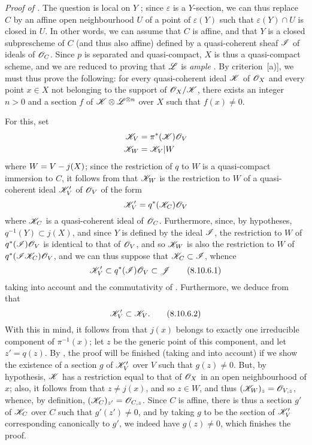 \begin{env}[8.10.6]
\label{II.8.10.6}
\emph{Proof of .}
The question is local on $Y$ ;
since $\varepsilon$ is a $Y$-section, we can thus replace $C$ by an affine open neighbourhood $U$ of a point of $\varepsilon(Y)$ such that $\varepsilon(Y)\cap U$ is closed in $U$.
In other words, we can assume that $C$ is affine, and that $Y$ is a closed subprescheme of $C$ (and thus also affine) defined by a quasi-coherent sheaf
$\mathscr{I}$ of ideals of $\mathscr{O}_C$.
Since $p$ is separated and quasi-compact, $X$ is thus a quasi-compact scheme, and we are reduced to proving that $\mathscr{L}$ is \emph{ample} .
By criterion~[a)], we must thus prove the following:
for every quasi-coherent ideal $\mathscr{K}$ of $\mathscr{O}_X$ and every point $x\in X$ not belonging to the support of $\mathscr{O}_X/\mathscr{K}$, there exists an integer $n>0$ and a section $f$ of $\mathscr{K}\otimes\mathscr{L}^{\otimes n}$ over $X$ such that $f(x)\neq0$.

For this, set
\begin{align*}
    \mathscr{K}_V &= \pi^*(\mathscr{K})\mathscr{O}_V
\\  \mathscr{K}_W &= \mathscr{K}_V|W
\end{align*}
where $W=V- j(X)$;
since the restriction of $q$ to $W$ is a quasi-compact immersion to $C$, it follows from  that $\mathscr{K}_W$ is the restriction to $W$ of a quasi-coherent ideal $\mathscr{K}'_V$ of $\mathscr{O}_V$ of the form
\[
    \mathscr{K}'_V = q^*(\mathscr{K}_C)\mathscr{O}_V
\]
where $\mathscr{K}_C$ is a quasi-coherent ideal of $\mathscr{O}_C$.
Furthermore, since, by hypotheses, $q^{-1}(Y)\subset j(X)$, and since $Y$ is defined by the ideal $\mathscr{I}$, the restriction to $W$ of $q^*(\mathscr{I})\mathscr{O}_V$ is identical to that of $\mathscr{O}_V$, and so $\mathscr{K}_W$ is also the restriction to $W$ of $q^*(\mathscr{I}\mathscr{K}_C)\mathscr{O}_V$, and we can thus suppose that $\mathscr{K}_C\subset\mathscr{I}$, whence
\[
\label{II.8.10.6.1}
    \mathscr{K}'_V \subset q^*(\mathscr{I})\mathscr{O}_V \subset \mathscr{J}
\tag{8.10.6.1}
\]
taking into account  and the commutativity of .
Furthermore, we deduce from  that
\[
\label{II.8.10.6.2}
    \mathscr{K}'_V \subset \mathscr{K}_V.
\tag{8.10.6.2}
\]
With this in mind, it follows from  that $j(x)$ belongs to exactly one irreducible component of $\pi^{-1}(x)$;
let $z$ be the generic point of this component, and let $z'=q(z)$.
By , the proof will be finished (taking  and  into account) if we show the existence of a section $g$ of $\mathscr{K}'_V$ over $V$ such that $g(z)\neq0$.
But, by hypothesis, $\mathscr{K}$ has a restriction equal to that of $\mathscr{O}_X$ in an open neighbourhood of $x$;
also, it follows from  that $z\neq j(x)$, and so $z\in W$, and thus $(\mathscr{K}_W)_z=\mathscr{O}_{V,z}$, whence, by definition, $(\mathscr{K}_C)_{z'}=\mathscr{O}_{C,z}$.
Since $C$ is affine, there is thus a section $g'$ of $\mathscr{K}_C$ over $C$ such that $g'(z')\neq0$, and by taking $g$ to be the section of $\mathscr{K}'_V$ corresponding canonically to $g'$, we indeed have $g(z)\neq0$, which finishes the proof.
\end{env}

